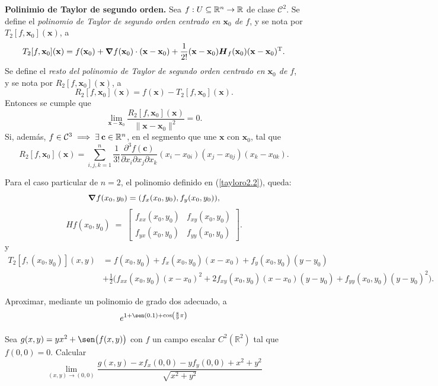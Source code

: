 \begin{theorem}\label{tayloro2.2} \textbf{Polinimio de Taylor de segundo orden.}  Sea $f:U\subseteq\mathbb{R}^n\to\mathbb{R}$ de clase $\mathcal{C}^2$. Se define el \emph{polinomio de Taylor de segundo orden centrado en $\mathbf{x}_0$ de $f$}, y se nota por $T_2[f,\mathbf{x}_0](\mathbf{x})$, a
  \[
    T_2[f,\mathbf{x}_0](\mathbf{x})=f(\mathbf{x}_0)+\grad{f}(\mathbf{x}_0)\cdot(\mathbf{x-x}_0)+\frac{1}{2!}(\mathbf{x-x}_0)\boldsymbol{H}_f(\mathbf{x}_0)(\mathbf{x-x}_0)^\text{T}.
  \]
  Se define el \emph{resto del polinomio de Taylor de segundo orden centrado en $\mathbf{x}_0$ de $f$}, y se nota por $R_2[f,\mathbf{x}_0](\mathbf{x})$, a
  \[
    R_2[f,\mathbf{x}_0](\mathbf{x})=f(\mathbf{x})-T_2[f,\mathbf{x}_0](\mathbf{x}).
  \]
  Entonces se cumple que
  \[
    \lim_{\mathbf{x-x}_0}\dfrac{R_2[f,\mathbf{x}_0](\mathbf{x})}{\|\mathbf{x-x}_0\|^2}=0.
  \]
  Si, adem\'as, $f\in\mathcal{C}^3\implies\exists\:\mathbf{c}\in\mathbb{R}^n$, en el segmento que une $\mathbf{x}$ con $\mathbf{x}_0$, tal que
  \[
    R_2[f,\mathbf{x}_0](\mathbf{x})=\sum_{i,j,k=1}^{n}\frac{1}{3!}\dfrac{\partial^3 f(\mathbf{c})}{\partial x_i \partial x_j \partial x_k}(x_i-x_{0i})(x_j-x_{0j})(x_k-x_{0k}).
  \]
\end{theorem}

\begin{obs}  Para el caso particular de $n=2$,  el polinomio definido en  (\ref{tayloro2.2}), queda:   $$\grad{f}(x_0,y_0) = ( f_x(x_0,y_0), f_y(x_0,y_0)), $$
$$Hf(x_0,y_0) \;=\; 
\begin{bmatrix}
  f_{xx}(x_0,y_0) & f_{xy}(x_0,y_0) \\[6pt]
  f_{yx}(x_0,y_0) & f_{yy}(x_0,y_0)
\end{bmatrix}.
$$ y 
\begin{align*}
  T_2[f, (x_0,y_0)](x,y) &=   f(x_0,y_0)  + f_x(x_0,y_0)(x-x_0) + f_y(x_0,y_0)(y-y_0) \\
&+ \tfrac{1}{2}\Big( f_{xx}(x_0,y_0)(x-x_0)^2 + 2f_{xy}(x_0,y_0)(x-x_0)(y-y_0) + f_{yy}(x_0,y_0)(y-y_0)^2\Big).
\end{align*} 
\end{obs}

\begin{tarea} Aproximar, mediante un polinomio de grado dos adecuado, a
$$e^{1+\sen(0.1)+\cos\left(\frac{8}{9}\pi\right)}$$
\end{tarea}


\begin{tarea}
Sea $g(x,y)=yx^{2} + \sen\big(f(x,y)\big)$  con $f$  un campo escalar  $C^{2}(\mathbb{R}^{2})$ tal que $f(0,0)=0$. Calcular 
$$\lim_{(x,y)\rightarrow(0,0)} \dfrac{g(x,y) - xf_x(0,0) - yf_y(0,0)+x^{2}+y^{2}}{\sqrt{x^{2}+y^{2}} }$$
\end{tarea}




